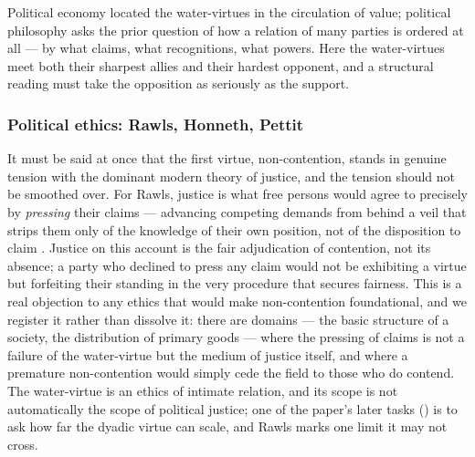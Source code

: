 Political economy located the water-virtues in the circulation of value; political philosophy asks the prior question of how a relation of many parties is ordered at all --- by what claims, what recognitions, what powers. Here the water-virtues meet both their sharpest allies and their hardest opponent, and a structural reading must take the opposition as seriously as the support.

\subsubsection{Political ethics: Rawls, Honneth, Pettit}
\label{p20:ssub:review-polethics}

It must be said at once that the first virtue, non-contention, stands in genuine tension with the dominant modern theory of justice, and the tension should not be smoothed over. For Rawls, justice is what free persons would agree to precisely by \emph{pressing} their claims --- advancing competing demands from behind a veil that strips them only of the knowledge of their own position, not of the disposition to claim \parencite{rawls1971}. Justice on this account is the fair adjudication of contention, not its absence; a party who declined to press any claim would not be exhibiting a virtue but forfeiting their standing in the very procedure that secures fairness. This is a real objection to any ethics that would make non-contention foundational, and we register it rather than dissolve it: there are domains --- the basic structure of a society, the distribution of primary goods --- where the pressing of claims is not a failure of the water-virtue but the medium of justice itself, and where a premature non-contention would simply cede the field to those who do contend. The water-virtue is an ethics of intimate relation, and its scope is not automatically the scope of political justice; one of the paper's later tasks () is to ask how far the dyadic virtue can scale, and Rawls marks one limit it may not cross.

